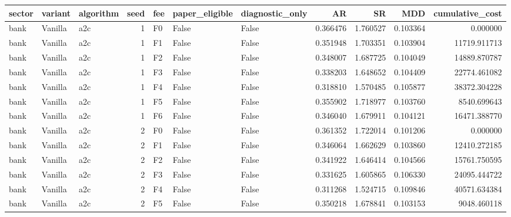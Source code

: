 \begin{tabular}{lllrlllrrrr}
\toprule
    sector & variant & algorithm &  seed & fee &  paper\_eligible &  diagnostic\_only &        AR &        SR &      MDD &  cumulative\_cost \\
\midrule
      bank & Vanilla &       a2c &     1 &  F0 &           False &            False &  0.366476 &  1.760527 & 0.103364 &         0.000000 \\
      bank & Vanilla &       a2c &     1 &  F1 &           False &            False &  0.351948 &  1.703351 & 0.103904 &     11719.911713 \\
      bank & Vanilla &       a2c &     1 &  F2 &           False &            False &  0.348007 &  1.687725 & 0.104049 &     14889.870787 \\
      bank & Vanilla &       a2c &     1 &  F3 &           False &            False &  0.338203 &  1.648652 & 0.104409 &     22774.461082 \\
      bank & Vanilla &       a2c &     1 &  F4 &           False &            False &  0.318810 &  1.570485 & 0.105877 &     38372.304228 \\
      bank & Vanilla &       a2c &     1 &  F5 &           False &            False &  0.355902 &  1.718977 & 0.103760 &      8540.699643 \\
      bank & Vanilla &       a2c &     1 &  F6 &           False &            False &  0.346040 &  1.679911 & 0.104121 &     16471.388770 \\
      bank & Vanilla &       a2c &     2 &  F0 &           False &            False &  0.361352 &  1.722014 & 0.101206 &         0.000000 \\
      bank & Vanilla &       a2c &     2 &  F1 &           False &            False &  0.346064 &  1.662629 & 0.103860 &     12410.272185 \\
      bank & Vanilla &       a2c &     2 &  F2 &           False &            False &  0.341922 &  1.646414 & 0.104566 &     15761.750595 \\
      bank & Vanilla &       a2c &     2 &  F3 &           False &            False &  0.331625 &  1.605865 & 0.106330 &     24095.444722 \\
      bank & Vanilla &       a2c &     2 &  F4 &           False &            False &  0.311268 &  1.524715 & 0.109846 &     40571.634384 \\
      bank & Vanilla &       a2c &     2 &  F5 &           False &            False &  0.350218 &  1.678841 & 0.103153 &      9048.460118 \\

\end{tabular}
